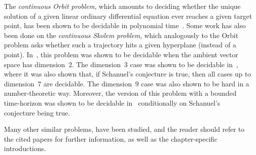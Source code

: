 The \emph{continuous Orbit problem}, which amounts to deciding whether the unique solution of a given linear ordinary differential equation ever reaches a given target point, has been shown to be decidable in polynomial time~\cite{Hainry08,ContinuousOrbitIPL}.
Some work has also been done on the \emph{continuous Skolem problem}, which analogously to the Orbit problem asks whether such a trajectory hits a given hyperplane (instead of a point).
In~\cite{ContinuousSkolem}, this problem was shown to be decidable when the ambient vector space has dimension~$2$. The dimension~$3$ case was shown to be decidable in~\cite{VCthesis}, where it was also shown that, if Schanuel's conjecture is true, then all cases up to dimension~$7$ are decidable. The dimension~$9$ case was also shown to be hard in a number-theoretic way.
Moreover, the version of this problem with a bounded time-horizon was shown to be decidable in~\cite{ContinuousSkolem3} conditionally on Schanuel's conjecture being true.

Many other similar problems, have been studied, and the reader should refer to the cited papers for further information, as well as the chapter-specific introductions.
